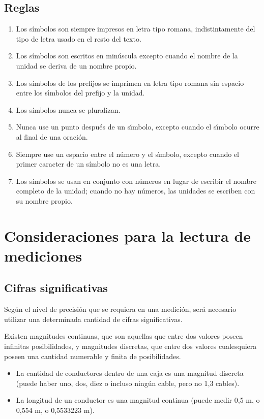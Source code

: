 \subsection{Reglas}
\begin{enumerate}
	\item Los símbolos son siempre impresos en letra tipo romana, indistintamente del tipo de letra usado en el resto del texto.
	\item Los símbolos son escritos en minúscula excepto cuando el nombre de la unidad se deriva de un nombre propio.
	\item Los símbolos de los prefijos se imprimen en letra tipo romana sin espacio entre los sı́mbolos del prefijo y la unidad.
	\item Los símbolos nunca se pluralizan.
	\item Nunca use un punto después de un sı́mbolo, excepto cuando el sı́mbolo ocurre al final de una oración.
	\item Siempre use un espacio entre el número y el sı́mbolo, excepto cuando el primer caracter de un símbolo no es una letra.
	\item Los símbolos se usan en conjunto con números en lugar de escribir el nombre completo de la unidad; cuando no hay números, las unidades se escriben con su nombre propio.
	
\end{enumerate}
\section{Consideraciones para la lectura de mediciones}
\subsection{Cifras significativas}
Según el nivel de precisión que se requiera en una medición, será necesario utilizar una determinada cantidad de cifras significativas.

Existen magnitudes continuas, que son aquellas que entre dos valores poseen infinitas posibilidades, y magnitudes discretas, que entre dos valores cualesquiera poseen una cantidad numerable y finita de posibilidades.

\begin{ejemplo}
	\begin{itemize}
		\item La cantidad de conductores dentro de una caja es una magnitud discreta (puede haber uno, dos, diez o incluso ningún cable, pero no 1,3 cables).
		\item La longitud de un conductor es una magnitud continua (puede medir 0,5 m, o 0,554 m, o 0,5533223 m).
	\end{itemize}
\end{ejemplo}

